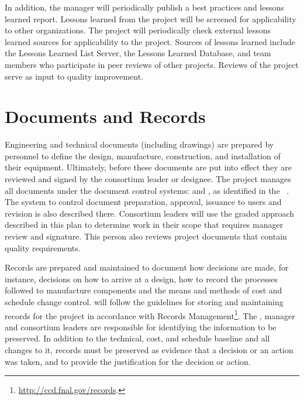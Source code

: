 In addition, the   manager will
periodically publish a best practices and lessons learned
report. Lessons learned from the  project will be screened
for applicability to other organizations. The  project
will periodically check external lessons learned sources for
applicability to the  project. Sources of lessons learned
include the  Lessons Learned List Server, the \fnal {}
Lessons Learned Database, and  team members who
participate in peer reviews of other projects. Reviews of the
 project serve as input to quality improvement.

\section{Documents and Records}

Engineering and technical documents (including drawings) are 
    prepared by  personnel to define the design, manufacture, 
    construction, and installation of their equipment. 
 Ultimately, before these documents are put into effect
they are reviewed and signed by the  consortium leader or
designee. The
 project manages all documents under the document control
systems:  and \docdb, as identified in the 
~\cite{bib:docdb82}.  The system to control document preparation, approval,
issuance to users and revision is also described there. Consortium
leaders will use the graded approach described in this plan to
determine work in their scope that requires  
 manager review and signature. This person also reviews project documents that
contain quality requirements. %

Records are prepared and maintained to document how decisions are
made, for instance, decisions on how to arrive at a design, how to
record the processes followed to manufacture components and the means
and methods of cost and schedule change
control.  will follow the guidelines for
storing and maintaining records for the project in accordance with
\fnal Records Management\footnote{\url{http://ccd.fnal.gov/records}.}. The
 ,  
manager and consortium leaders are responsible for identifying the
information to be preserved. In addition to the technical, cost, and
schedule baseline and all changes to it, records must be preserved as
evidence that a decision or an action was taken, and to provide
the justification for the decision or action.

